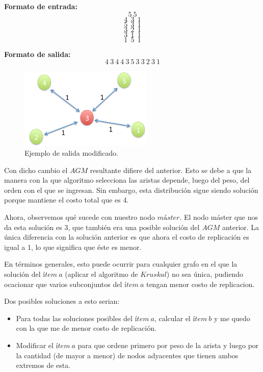 \textbf{Formato de entrada:}
$$5\ 5$$
$$4\ \ 3\ \ 1$$
$$5\ \ 3\ \ 1$$
$$3\ \ 2\ \ 1$$
$$3\ \ 1\ \ 1$$
$$1\ \ 5\ \ 1$$

\textbf{Formato de salida:}
$$4\ 3\ 4\ 4\ 3\ 5\ 3\ 3\ 2\ 3\ 1$$

\begin{figure}[H] %
\begin{center}
\includegraphics[width=180pt]{../imgs/pregAdicional03.jpg}
\caption{Ejemplo de salida modificado.}
\end{center}
\end{figure}

 Con dicho cambio el $AGM$ resultante difiere del anterior. Esto se debe a que la manera con la que algoritmo selecciona las aristas depende, luego del peso, del orden con el que se ingresan. Sin embargo, esta distribución sigue siendo solución porque mantiene el costo total que es 4. \newline

 Ahora, observemos qué sucede con nuestro nodo $máster$. El nodo máster que nos da esta solución es 3, que también era una posible solución del $AGM$ anterior. La única diferencia con la solución anterior es que ahora el costo de replicación es igual a 1, lo que significa que éste es menor. \newline

En términos generales, esto puede ocurrir para cualquier grafo en el que la solución del $ítem\ a$ (aplicar el algoritmo de $Kruskal$) no sea única, pudiendo ocacionar que varios subconjuntos del $ítem\ a$ tengan menor costo de replicacion.\newline

Dos posibles soluciones a esto serian:
\begin{itemize}
\item Para todas las soluciones posibles del  $ítem\ a$, calcular el $ítem\ b$ y me quedo con la que me de menor costo de replicación.
\item Modificar el  $ítem\ a$ para que ordene primero por peso de la arista y luego por la cantidad (de mayor a menor) de nodos adyacentes que tienen ambos extremos de esta. 
\end{itemize}
